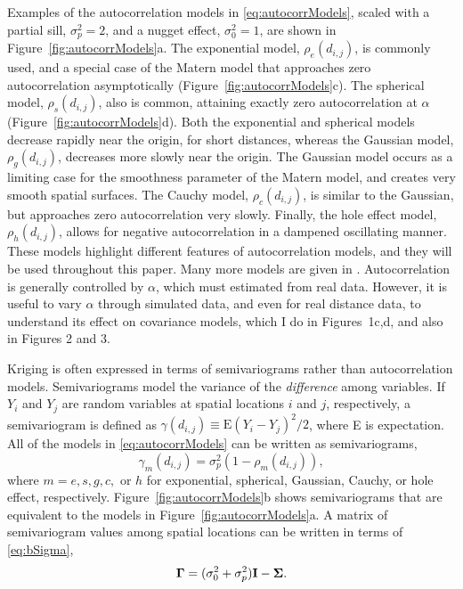 \documentclass[11pt, titlepage]{article}\usepackage[]{graphicx}\usepackage[]{color}
\begin{document}
\begin{spacing}{1.9}
\begin{flushleft}
Examples of the autocorrelation models in \ref{eq:autocorrModels}, scaled with a partial sill, $\sigma^2_p = 2$, and a nugget effect, $\sigma^2_0 = 1$, are shown in Figure~\ref{fig:autocorrModels}a.  The exponential model, $\rho_e(d_{i,j})$, is commonly used, and a special case of the Matern model that approaches zero autocorrelation asymptotically (Figure~\ref{fig:autocorrModels}c). The spherical model, $\rho_s(d_{i,j})$, also is common, attaining exactly zero autocorrelation at $\alpha$ (Figure~\ref{fig:autocorrModels}d).  Both the exponential and spherical models decrease rapidly near the origin, for short distances, whereas the Gaussian model, $\rho_g(d_{i,j})$, decreases more slowly near the origin. The Gaussian model occurs as a limiting case for the smoothness parameter of the Matern model, and creates very smooth spatial surfaces. The Cauchy model, $\rho_c(d_{i,j})$, is similar to the Gaussian, but approaches zero autocorrelation very slowly. Finally, the hole effect model, $\rho_h(d_{i,j})$, allows for negative autocorrelation in a dampened oscillating manner. These models highlight different features of autocorrelation models, and they will be used throughout this paper. Many more models are given in \citet[][p. 80--93]{Chil:Delf:geos:1999}.  Autocorrelation is generally controlled by $\alpha$, which must estimated from real data.  However, it is useful to vary $\alpha$ through simulated data, and even for real distance data, to understand its effect on covariance models, which I do in Figures~1c,d, and also in Figures 2 and 3.

Kriging is often expressed in terms of semivariograms rather than autocorrelation models.  Semivariograms model the variance of the \emph{difference} among variables. If $Y_i$ and $Y_j$ are random variables at spatial locations $i$ and $j$, respectively, a semivariogram is defined as $\gamma(d_{i,j}) \equiv \textrm{E}(Y_i - Y_j)^2/2$, where E is expectation.  All of the models in \ref{eq:autocorrModels} can be written as semivariograms,
\begin{equation} \label{eq:semivarrho}
				\gamma_m(d_{i,j}) = \sigma^2_p(1 - \rho_m(d_{i,j})),
\end{equation}
where $m = e, s, g, c,$ or $h$ for exponential, spherical, Gaussian, Cauchy, or hole effect, respectively. Figure~\ref{fig:autocorrModels}b shows semivariograms that are equivalent to the models in Figure~\ref{fig:autocorrModels}a.  A matrix of semivariogram values among spatial locations can be written in terms of \ref{eq:bSigma},
\[
\mbox{\boldmath $\Gamma$} = (\sigma_0^2 + \sigma^2_p)\mathbf{I} - \mbox{\boldmath $\Sigma$}.
\]


\end{flushleft}
\end{spacing}
\end{document}
